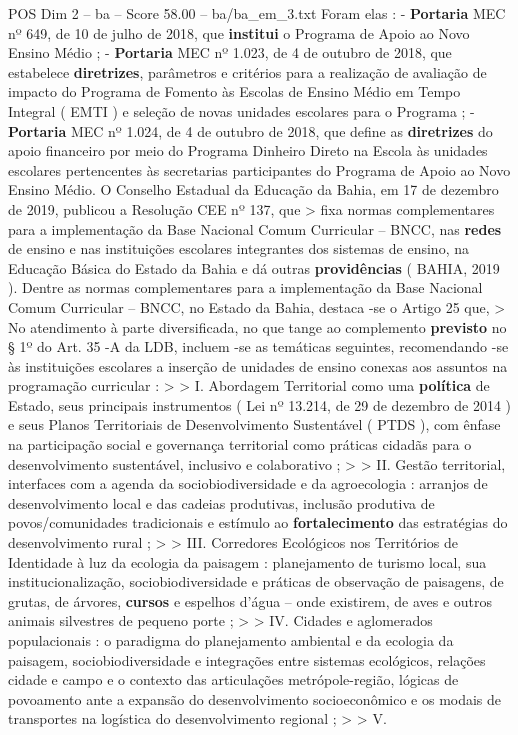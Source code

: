 \begin{textsample}{POS Dim 2 – ba – Score 58.00 – ba/ba\_em\_3.txt}
Foram elas : - \textbf{Portaria} MEC nº 649, de 10 de julho de 2018, que \textbf{institui} o Programa de Apoio ao Novo Ensino Médio ; - \textbf{Portaria} MEC nº 1.023, de 4 de outubro de 2018, que estabelece \textbf{diretrizes}, parâmetros e critérios para a realização de avaliação de impacto do Programa de Fomento às Escolas de Ensino Médio em Tempo Integral ( EMTI ) e seleção de novas unidades escolares para o Programa ; - \textbf{Portaria} MEC nº 1.024, de 4 de outubro de 2018, que define as \textbf{diretrizes} do apoio financeiro por meio do Programa Dinheiro Direto na Escola às unidades escolares pertencentes às secretarias participantes do Programa de Apoio ao Novo Ensino Médio.
O Conselho Estadual da Educação da Bahia, em 17 de dezembro de 2019, publicou a Resolução CEE nº 137, que > fixa normas complementares para a implementação da Base Nacional Comum Curricular – BNCC, nas \textbf{redes} de ensino e nas instituições escolares integrantes dos sistemas de ensino, na Educação Básica do Estado da Bahia e dá outras \textbf{providências} ( BAHIA, 2019 ).
Dentre as normas complementares para a implementação da Base Nacional Comum Curricular – BNCC, no Estado da Bahia, destaca -se o Artigo 25 que, > No atendimento à parte diversificada, no que tange ao complemento \textbf{previsto} no § 1º do Art. 35 -A da LDB, incluem -se as temáticas seguintes, recomendando -se às instituições escolares a inserção de unidades de ensino conexas aos assuntos na programação curricular : > > I.
Abordagem Territorial como uma \textbf{política} de Estado, seus principais instrumentos ( Lei nº 13.214, de 29 de dezembro de 2014 ) e seus Planos Territoriais de Desenvolvimento Sustentável ( PTDS ), com ênfase na participação social e governança territorial como práticas cidadãs para o desenvolvimento sustentável, inclusivo e colaborativo ; > > II.
Gestão territorial, interfaces com a agenda da sociobiodiversidade e da agroecologia : arranjos de desenvolvimento local e das cadeias produtivas, inclusão produtiva de povos/comunidades tradicionais e estímulo ao \textbf{fortalecimento} das estratégias do desenvolvimento rural ; > > III.
Corredores Ecológicos nos Territórios de Identidade à luz da ecologia da paisagem : planejamento de turismo local, sua institucionalização, sociobiodiversidade e práticas de observação de paisagens, de grutas, de árvores, \textbf{cursos} e espelhos d’água – onde existirem, de aves e outros animais silvestres de pequeno porte ; > > IV.
Cidades e aglomerados populacionais : o paradigma do planejamento ambiental e da ecologia da paisagem, sociobiodiversidade e integrações entre sistemas ecológicos, relações cidade e campo e o contexto das articulações metrópole-região, lógicas de povoamento ante a expansão do desenvolvimento socioeconômico e os modais de transportes na logística do desenvolvimento regional ; > > V.

\end{textsample}
